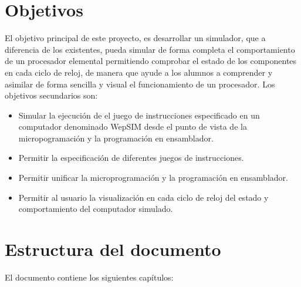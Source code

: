 \section{Objetivos}
\label{sec:objectives}

El objetivo principal de este proyecto, es desarrollar un simulador, que a diferencia de los existentes, pueda simular de forma completa el comportamiento de un procesador elemental permitiendo comprobar el estado de los componentes en cada ciclo de reloj, de manera que ayude a los alumnos a comprender y asimilar de forma sencilla y visual el funcionamiento de un procesador. Los objetivos secundarios son:

\begin{itemize}

\item Simular la ejecución de el juego de instrucciones especificado en un computador denominado WepSIM desde el punto de vista de la micropogramación y la programación en ensamblador.

\item Permitir la especificación de diferentes juegos de instrucciones.

\item Permitir unificar la microprogramación y la programación en ensamblador.

\item Permitir al usuario la visualización en cada ciclo de reloj del estado y comportamiento del computador simulado.

\end{itemize}

\section{Estructura del documento}
\label{sec:document_structure}

El documento contiene los siguientes capítulos:

